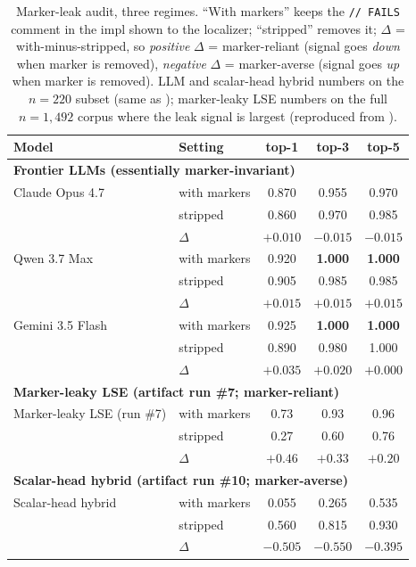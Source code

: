 \documentclass[10pt]{article}
\begin{document}
\begin{table}[t]
\centering
\small
\caption{Marker-leak audit, three regimes. ``With markers'' keeps
the \texttt{// FAILS} comment in the impl shown to the localizer;
``stripped'' removes it; $\Delta$ = with-minus-stripped, so
\emph{positive} $\Delta$ = marker-reliant (signal goes \emph{down}
when marker is removed), \emph{negative} $\Delta$ = marker-averse
(signal goes \emph{up} when marker is removed). LLM and scalar-head hybrid
numbers on the $n=220$ subset (same as );
marker-leaky LSE numbers on the full $n=1{,}492$ corpus where the leak
signal is largest (reproduced from ).}
\label{tab:llm-marker-audit}
\begin{tabular}{llccc}
\toprule
Model & Setting & top-1 & top-3 & top-5 \\
\midrule
\multicolumn{5}{l}{\textbf{Frontier LLMs (essentially marker-invariant)}} \\
Claude Opus 4.7    & with markers & 0.870    & 0.955          & 0.970 \\
                   & stripped     & 0.860    & 0.970          & 0.985 \\
                   & $\Delta$     & $+0.010$ & $-0.015$       & $-0.015$ \\[2pt]
Qwen 3.7 Max       & with markers & 0.920    & \textbf{1.000} & \textbf{1.000} \\
                   & stripped     & 0.905    & 0.985          & 0.985 \\
                   & $\Delta$     & $+0.015$ & $+0.015$       & $+0.015$ \\[2pt]
Gemini 3.5 Flash   & with markers & 0.925    & \textbf{1.000} & \textbf{1.000} \\
                   & stripped     & 0.890    & 0.980          & 1.000 \\
                   & $\Delta$     & $+0.035$ & $+0.020$       & $+0.000$ \\
\midrule
\multicolumn{5}{l}{\textbf{Marker-leaky LSE (artifact run \#7; marker-reliant)}} \\
Marker-leaky LSE (run \#7)     & with markers & 0.73     & 0.93           & 0.96  \\
                   & stripped     & 0.27     & 0.60           & 0.76  \\
                   & $\Delta$     & $+0.46$  & $+0.33$        & $+0.20$ \\
\midrule
\multicolumn{5}{l}{\textbf{Scalar-head hybrid (artifact run \#10; marker-averse)}} \\
Scalar-head hybrid & with markers & 0.055    & 0.265          & 0.535 \\
                   & stripped     & 0.560    & 0.815          & 0.930 \\
                   & $\Delta$     & $\mathbf{-0.505}$ & $\mathbf{-0.550}$ & $\mathbf{-0.395}$ \\
\bottomrule
\end{tabular}
\end{table}
\end{document}
